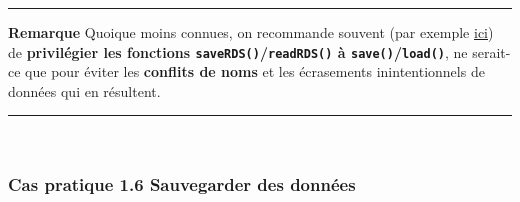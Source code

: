 \documentclass[12pt,twosided, notitlepage]{book}
\begin{document}
\begin{center}\rule{0.5\linewidth}{\linethickness}\end{center}

\textbf{Remarque} Quoique moins connues, on recommande souvent (par
exemple
\href{http://www.fromthebottomoftheheap.net/2012/04/01/saving-and-loading-r-objects/}{ici})
de \textbf{privilégier les fonctions
\texttt{saveRDS()}/\texttt{readRDS()} à
\texttt{save()}/\texttt{load()}}, ne serait-ce que pour éviter les
\textbf{conflits de noms} et les écrasements inintentionnels de données
qui en résultent.

\begin{center}\rule{0.5\linewidth}{\linethickness}\end{center}

~

\subsubsection{\texorpdfstring{\textbf{Cas pratique 1.6} Sauvegarder des
données}{Cas pratique 1.6 Sauvegarder des données}}\label{cas-pratique-1.6-sauvegarder-des-donnees}

\end{document}
